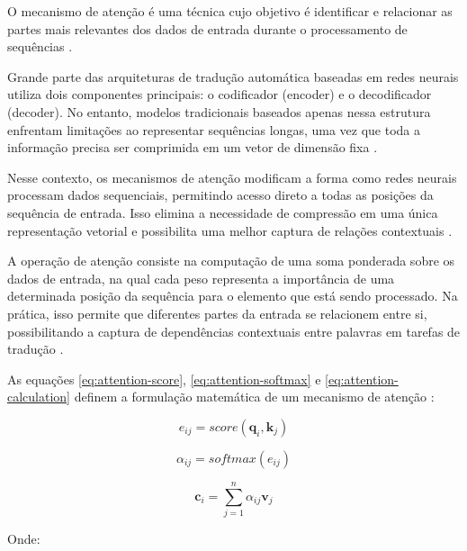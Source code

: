 O mecanismo de atenção é uma técnica cujo objetivo é identificar e relacionar
as partes mais relevantes dos dados de entrada durante o processamento de
sequências \cite{hays2026attentionmechanismsneuralnetworks}.

Grande parte das arquiteturas de tradução automática baseadas em redes neurais
utiliza dois componentes principais: o codificador (encoder) e o decodificador
(decoder). No entanto, modelos
tradicionais baseados apenas nessa estrutura enfrentam limitações ao
representar sequências longas, uma vez que toda a informação precisa ser
comprimida em um vetor de dimensão fixa \cite{hays2026attentionmechanismsneuralnetworks}.

Nesse contexto, os mecanismos de atenção modificam a forma como redes neurais
processam dados sequenciais, permitindo acesso direto a todas as posições da
sequência de entrada. Isso elimina a necessidade de compressão em uma única
representação vetorial e possibilita uma melhor captura de relações
contextuais \cite{hays2026attentionmechanismsneuralnetworks}.

A operação de atenção consiste na computação de uma soma ponderada sobre os
dados de entrada, na qual cada peso representa a importância de uma determinada
posição da sequência para o elemento que está sendo processado. Na prática,
isso permite que diferentes partes da entrada se relacionem entre si,
possibilitando a captura de dependências contextuais entre palavras em tarefas
de tradução \cite{hays2026attentionmechanismsneuralnetworks}.

As equações \ref{eq:attention-score}, \ref{eq:attention-softmax} e \ref{eq:attention-calculation} definem a formulação matemática de um mecanismo de atenção
\cite{hays2026attentionmechanismsneuralnetworks}:

\begin{equation}
    e_{ij} = score(\mathbf{q}_i, \mathbf{k}_j)
    \label{eq:attention-score}
\end{equation}

\begin{equation}
    \alpha_{ij} = softmax(e_{ij})
    \label{eq:attention-softmax}
\end{equation}

\begin{equation}
    \mathbf{c}_i = \sum_{j=1}^{n} \alpha_{ij} \mathbf{v}_j
    \label{eq:attention-calculation}
\end{equation}

Onde:

